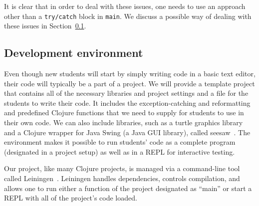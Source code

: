 \documentclass[submission,copyright,creativecommons]{eptcs}
\newcommand{\allcomments}[1]{{#1}}
\newcommand{\elenacomment}[1]{{\bf \textcolor{ForestGreen}{\allcomments{{#1}}}}}
\newcommand{\joecomment}[1]{{\bf \color{JoesGold}{\allcomments{{#1}}}}}
\begin{document}
It is clear that in order to deal with these issues, one needs to use an approach other than a {\tt try/catch} block in {\tt main}. We discuss a possible way of dealing with these issues in Section~\ref{subsec:envt}.



\subsection{Development environment}\label{subsec:envt}
Even though new students will start by simply writing code in a basic text editor, their code will typically be a part of a project.
We will provide a template project that contains all of the necessary libraries and project settings and %
a file for the students to write their code. It includes the exception-catching and reformatting and predefined Clojure functions that we need to supply for students to use in their own code. We can also include libraries, such as a turtle graphics library~\cite{turtle} and a Clojure wrapper for Java Swing (a Java GUI library), called seesaw~\cite{graphics}. The environment makes it possible to run students' code as a complete program (designated in a project setup) as well as in a REPL %
for interactive testing. 

Our project, like many Clojure projects, is managed via a command-line tool called Leiningen~\cite{lein}. Leiningen handles dependencies, controls compilation, and allows one to run either a function of the project designated as ``main'' or start a REPL with all of the project's code loaded. 
\end{document}
